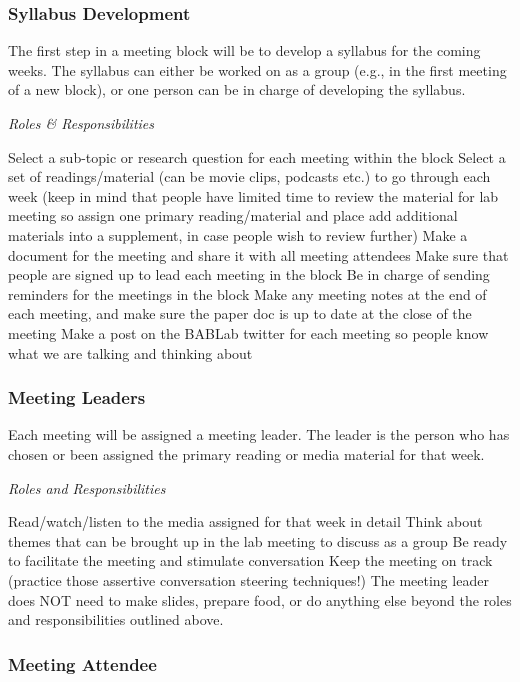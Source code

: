 \documentclass[]{book}
\begin{document}
\hypertarget{syllabus-development}{%
\subsubsection{Syllabus Development}\label{syllabus-development}}

The first step in a meeting block will be to develop a syllabus for the coming weeks. The syllabus can either be worked on as a group (e.g., in the first meeting of a new block), or one person can be in charge of developing the syllabus.

\emph{Roles \& Responsibilities}

Select a sub-topic or research question for each meeting within the block
Select a set of readings/material (can be movie clips, podcasts etc.) to go through each week (keep in mind that people have limited time to review the material for lab meeting so assign one primary reading/material and place add additional materials into a supplement, in case people wish to review further)
Make a document for the meeting and share it with all meeting attendees
Make sure that people are signed up to lead each meeting in the block
Be in charge of sending reminders for the meetings in the block
Make any meeting notes at the end of each meeting, and make sure the paper doc is up to date at the close of the meeting
Make a post on the BABLab twitter for each meeting so people know what we are talking and thinking about

\hypertarget{meeting-leaders}{%
\subsubsection{Meeting Leaders}\label{meeting-leaders}}

Each meeting will be assigned a meeting leader. The leader is the person who has chosen or been assigned the primary reading or media material for that week.

\emph{Roles and Responsibilities}

Read/watch/listen to the media assigned for that week in detail
Think about themes that can be brought up in the lab meeting to discuss as a group
Be ready to facilitate the meeting and stimulate conversation
Keep the meeting on track (practice those assertive conversation steering techniques!)
The meeting leader does NOT need to make slides, prepare food, or do anything else beyond the roles and responsibilities outlined above.

\hypertarget{meeting-attendee}{%
\subsubsection{Meeting Attendee}\label{meeting-attendee}}
\end{document}
